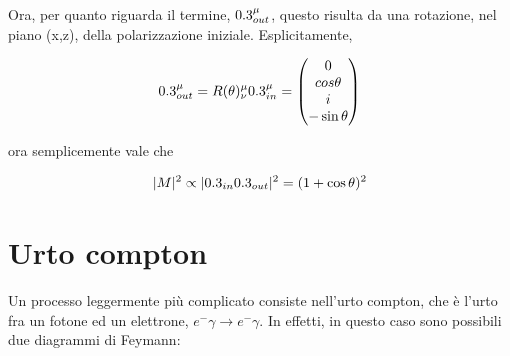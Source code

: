 \documentclass[11pt]{report}
\begin{document}
Ora, per quanto riguarda il termine, \(0.3^\mu_{out}\), questo risulta da una rotazione, nel piano (x,z), della polarizzazione iniziale. Esplicitamente, 

\begin{align}
    0.3^\mu_{out} = R(\theta)^\mu_\nu 0.3^\mu_{in} = \begin{pmatrix}
        0 \\ cos\theta \\ i \\ -\sin\theta
    \end{pmatrix}
\end{align}

ora semplicemente vale che 

\begin{align}
    \lvert M\rvert^2 \propto \lvert0.3_{in}0.3_{out}\rvert^2 = (1+\cos\theta)^2
\end{align}


\section{Urto compton}

Un processo leggermente più complicato consiste nell'urto compton, che è l'urto fra un fotone ed un elettrone, \(e^-\gamma \rightarrow e^-\gamma\). In effetti, in questo caso sono possibili due diagrammi di Feymann: 
\end{document}
